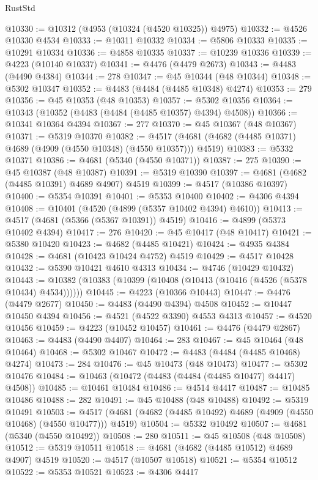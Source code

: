 \begin{lexlean}{RustStd}
\begin{coremodule}
@10330 := @10312 (@4953 (@10324 (@4520 @10325)) @4975)
@10332 := @4526 @10330 @4534
@10333 := @10311 @10332
@10334 := @5806 @10333
@10335 := @10291 @10334
@10336 := @4858 @10335
@10337 := @10239 @10336
@10339 := @4223 (@10140 @10337)
@10341 := @4476 (@4479 @2673)
@10343 := @4483 (@4490 @4384)
@10344 := 278
@10347 := @45 @10344 (@48 @10344)
@10348 := @5302 @10347
@10352 := @4483 (@4484 (@4485 @10348) @4274)
@10353 := 279
@10356 := @45 @10353 (@48 @10353)
@10357 := @5302 @10356
@10364 := @10343 (@10352 (@4483 (@4484 (@4485 @10357) @4394) @4508))
@10366 := @10341 @10364 @4394
@10367 := 277
@10370 := @45 @10367 (@48 @10367)
@10371 := @5319 @10370
@10382 := @4517 (@4681 (@4682 (@4485 @10371) @4689 (@4909 (@4550 @10348) (@4550 @10357))) @4519)
@10383 := @5332 @10371
@10386 := @4681 (@5340 (@4550 @10371))
@10387 := 275
@10390 := @45 @10387 (@48 @10387)
@10391 := @5319 @10390
@10397 := @4681 (@4682 (@4485 @10391) @4689 @4907) @4519
@10399 := @4517 (@10386 @10397)
@10400 := @5354 @10391
@10401 := @5353 @10400
@10402 := @4306 @4394
@10408 := @10401 (@4520 (@4899 (@5357 @10402 @4394) @4610))
@10413 := @4517 (@4681 (@5366 (@5367 @10391)) @4519)
@10416 := @4899 (@5373 @10402 @4394)
@10417 := 276
@10420 := @45 @10417 (@48 @10417)
@10421 := @5380 @10420
@10423 := @4682 (@4485 @10421)
@10424 := @4935 @4384
@10428 := @4681 (@10423 @10424 @4752) @4519
@10429 := @4517 @10428
@10432 := @5390 @10421 @4610 @4313
@10434 := @4746 (@10429 @10432)
@10443 := @10382 (@10383 (@10399 (@10408 (@10413 (@10416 (@4526 (@5378 @10434) @4534))))))
@10445 := @4223 (@10366 @10443)
@10447 := @4476 (@4479 @2677)
@10450 := @4483 (@4490 @4394) @4508
@10452 := @10447 @10450 @4394
@10456 := @4521 (@4522 @3390) @4553 @4313
@10457 := @4520 @10456
@10459 := @4223 (@10452 @10457)
@10461 := @4476 (@4479 @2867)
@10463 := @4483 (@4490 @4407)
@10464 := 283
@10467 := @45 @10464 (@48 @10464)
@10468 := @5302 @10467
@10472 := @4483 (@4484 (@4485 @10468) @4274)
@10473 := 284
@10476 := @45 @10473 (@48 @10473)
@10477 := @5302 @10476
@10484 := @10463 (@10472 (@4483 (@4484 (@4485 @10477) @4417) @4508))
@10485 := @10461 @10484
@10486 := @4514 @4417
@10487 := @10485 @10486
@10488 := 282
@10491 := @45 @10488 (@48 @10488)
@10492 := @5319 @10491
@10503 := @4517 (@4681 (@4682 (@4485 @10492) @4689 (@4909 (@4550 @10468) (@4550 @10477))) @4519)
@10504 := @5332 @10492
@10507 := @4681 (@5340 (@4550 @10492))
@10508 := 280
@10511 := @45 @10508 (@48 @10508)
@10512 := @5319 @10511
@10518 := @4681 (@4682 (@4485 @10512) @4689 @4907) @4519
@10520 := @4517 (@10507 @10518)
@10521 := @5354 @10512
@10522 := @5353 @10521
@10523 := @4306 @4417

\end{coremodule}
\end{lexlean}
